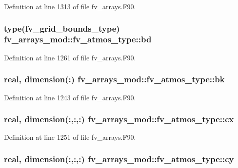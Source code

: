 Definition at line 1313 of file fv\-\_\-arrays.\-F90.

\subsubsection[{bd}]{\setlength{\rightskip}{0pt plus 5cm}type({\bf fv\-\_\-grid\-\_\-bounds\-\_\-type}) fv\-\_\-arrays\-\_\-mod\-::fv\-\_\-atmos\-\_\-type\-::bd}\label{structfv__arrays__mod_1_1fv__atmos__type_a2a2b12a650ed344e10e00ce708935c78}


Definition at line 1261 of file fv\-\_\-arrays.\-F90.

\subsubsection[{bk}]{\setlength{\rightskip}{0pt plus 5cm}real, dimension(\-:) fv\-\_\-arrays\-\_\-mod\-::fv\-\_\-atmos\-\_\-type\-::bk}\label{structfv__arrays__mod_1_1fv__atmos__type_a153c4671e9a6268efd9b3f1a4bae7f3c}


Definition at line 1243 of file fv\-\_\-arrays.\-F90.

\subsubsection[{cx}]{\setlength{\rightskip}{0pt plus 5cm}real, dimension(\-:,\-:,\-:) fv\-\_\-arrays\-\_\-mod\-::fv\-\_\-atmos\-\_\-type\-::cx}\label{structfv__arrays__mod_1_1fv__atmos__type_a9de9d89045261a87a6708b261b6b0600}


Definition at line 1251 of file fv\-\_\-arrays.\-F90.

\subsubsection[{cy}]{\setlength{\rightskip}{0pt plus 5cm}real, dimension(\-:,\-:,\-:) fv\-\_\-arrays\-\_\-mod\-::fv\-\_\-atmos\-\_\-type\-::cy}\label{structfv__arrays__mod_1_1fv__atmos__type_a6051004a5665381f98403598f0d841cb}


